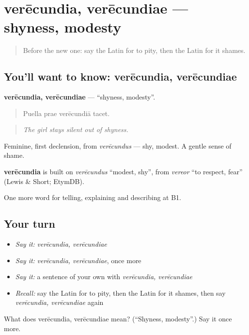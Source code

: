 \section[verēcundia, verēcundiae]{verēcundia, verēcundiae — shyness, modesty}

\label{lesson:LA-C513-verecundia}



\begin{quote}
Before the new one: say the Latin for to pity, then the Latin for it shames.
\end{quote}

\subsection*{You'll want to know: verēcundia, verēcundiae}
\textbf{verēcundia, verēcundiae} — \textquotedblleft{}shyness, modesty\textquotedblright{}.

\begin{quote}
Puella prae verēcundiā tacet.
\end{quote}

\begin{quote}
\emph{The girl stays silent out of shyness.}
\end{quote}

Feminine, first declension, from \emph{verēcundus} — shy, modest. A gentle sense of shame.

\begin{cousinweb}
\textbf{verēcundia} is built on \emph{verēcundus} \textquotedblleft{}modest, shy\textquotedblright{}, from \emph{vereor} \textquotedblleft{}to respect, fear\textquotedblright{} (Lewis \& Short; EtymDB).
\end{cousinweb}

\begin{grammarlens}[title={What you've built}]
One more word for telling, explaining and describing at B1.
\end{grammarlens}

\subsection*{Your turn}
\begin{itemize}
\raggedright
  \item \emph{Say it:} \emph{verēcundia, verēcundiae}
  \item \emph{Say it:} \emph{verēcundia, verēcundiae}, once more
  \item \emph{Say it:} a sentence of your own with \emph{verēcundia, verēcundiae}
  \item \emph{Recall:} say the Latin for to pity, then the Latin for it shames, then say \emph{verēcundia, verēcundiae} again
\end{itemize}

\begin{tcolorbox}[breakable,colback=teal!4,colframe=teal!35!black,title={Before you move on}]
What does verēcundia, verēcundiae mean? (\textquotedblleft{}Shyness, modesty\textquotedblright{}.) Say it once more.
\end{tcolorbox}
